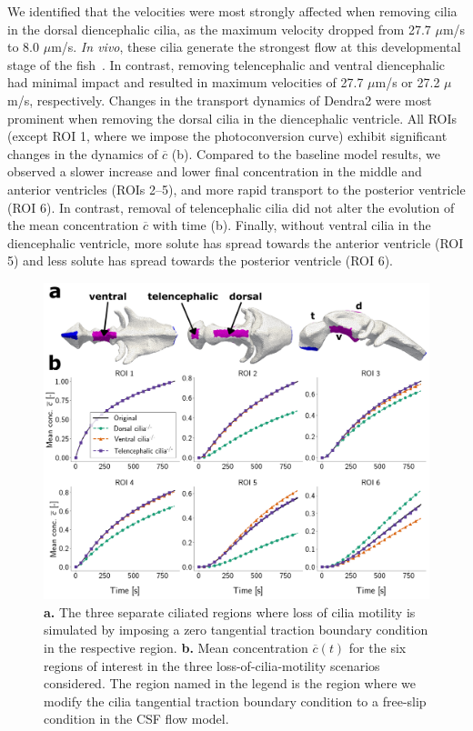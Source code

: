 \documentclass[fleqn]{wlscirep}
\newcommand{\cbar}{\overline{c}}
\begin{document}
We identified that the velocities were most strongly
affected when removing cilia in the dorsal diencephalic cilia,
as the maximum velocity dropped from 27.7 $\mu$m/s to 8.0 $\mu$m/s.
\emph{In vivo}, these cilia generate the strongest flow at
this developmental stage of the fish~\cite{Olstad2019CiliaryDevelopment}.
In contrast, removing telencephalic and ventral diencephalic had minimal
impact and resulted in maximum velocities of 27.7 $\mu$m/s or 27.2 $\mu$m/s, respectively.
Changes in the transport dynamics of Dendra2 were most prominent when removing the dorsal cilia
in the diencephalic ventricle. All ROIs (except ROI 1, where we impose the photoconversion curve)
exhibit significant changes in the dynamics of $\cbar$
(b).
Compared to the baseline model results, we observed a slower increase and lower final concentration
in the middle and anterior ventricles (ROIs 2--5),
and more rapid transport to the posterior ventricle (ROI 6).
In contrast, removal of telencephalic cilia did not alter the evolution of the
mean concentration $\cbar$ with time (b).
Finally, without ventral cilia in the diencephalic ventricle,
more solute has spread towards the anterior ventricle (ROI 5) and
less solute has spread towards the posterior ventricle (ROI 6).
\begin{figure}[H]
    \centering
    \includegraphics[width=\textwidth]{graphics/figure5_compare_cilia_modifications.png}
    \caption{\textbf{a.} The three separate ciliated regions where loss of cilia motility is simulated
    by imposing a zero tangential traction boundary condition in the respective region.
    \textbf{b.} Mean concentration $\cbar(t)$ for the six regions of interest in the three 
    loss-of-cilia-motility scenarios considered. The region named in the legend is the region
    where we modify the cilia tangential traction boundary condition to a free-slip condition
    in the CSF flow model.}
    \label{fig:figure5_compare_cilia_modifications}
\end{figure}
\end{document}
